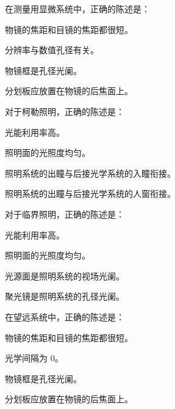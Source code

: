 \documentclass[padl, analysis, notocnum]{ExBook}
\newcommand{\answerarea}[1][3.5cm]{%
  \par\vspace{1mm}%
  \noindent{\color{themeColor!35}\rule{\linewidth}{0.4pt}}\par
  \noindent\begin{minipage}[t][#1][t]{\linewidth}\vspace{0pt}\end{minipage}\par
  \noindent{\color{themeColor!35}\rule{\linewidth}{0.4pt}}\par
}
\begin{document}
\begin{qitems}[startnum=7]
\qitem 在测量用显微系统中，正确的陈述是：
\par\noindent\hspace{2em}物镜的焦距和目镜的焦距都很短。
\par\noindent\hspace{2em}分辨率与数值孔径有关。
\par\noindent\hspace{2em}物镜框是孔径光阑。
\par\noindent\hspace{2em}分划板应放置在物镜的后焦面上。
\label{q:137:start}
\answerarea[4.0cm]
\label{q:137:end}
\end{qitems}

\begin{qitems}[startnum=8]
\qitem 对于柯勒照明，正确的陈述是：
\par\noindent\hspace{2em}光能利用率高。
\par\noindent\hspace{2em}照明面的光照度均匀。
\par\noindent\hspace{2em}照明系统的出瞳与后接光学系统的入瞳衔接。
\par\noindent\hspace{2em}照明系统的出瞳与后接光学系统的人窗衔接。
\label{q:138:start}
\answerarea[4.0cm]
\label{q:138:end}
\end{qitems}

\begin{qitems}[startnum=9]
\qitem 对于临界照明，正确的陈述是：
\par\noindent\hspace{2em}光能利用率高。
\par\noindent\hspace{2em}照明面的光照度均匀。
\par\noindent\hspace{2em}光源面是照明系统的视场光阑。
\par\noindent\hspace{2em}聚光镜是照明系统的孔径光阑。
\label{q:139:start}
\answerarea[4.0cm]
\label{q:139:end}
\end{qitems}

\begin{qitems}[startnum=10]
\qitem 在望远系统中，正确的陈述是：
\par\noindent\hspace{2em}物镜的焦距和目镜的焦距都很短。
\par\noindent\hspace{2em}光学间隔为 0。
\par\noindent\hspace{2em}物镜框是孔径光阑。
\par\noindent\hspace{2em}分划板应放置在物镜的后焦面上。
\label{q:140:start}
\answerarea[4.0cm]
\label{q:140:end}
\end{qitems}
\end{document}
